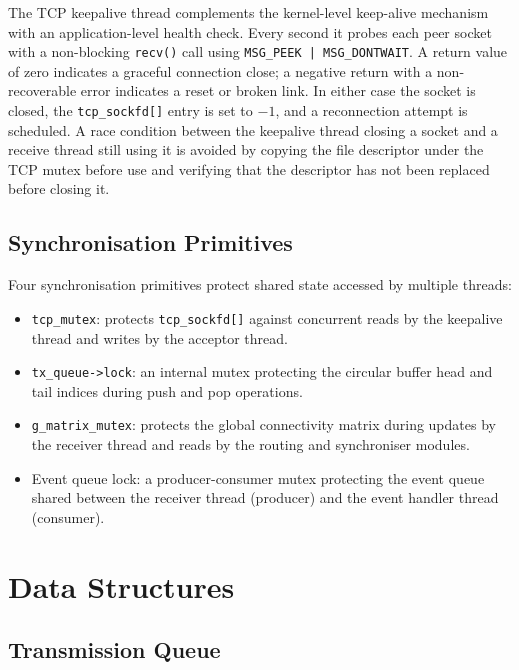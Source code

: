 The TCP keepalive thread complements the kernel-level keep-alive mechanism with an
application-level health check. Every second it probes each peer socket with a non-blocking
\texttt{recv()} call using \texttt{MSG\_PEEK | MSG\_DONTWAIT}. A return value of zero
indicates a graceful connection close; a negative return with a non-recoverable error indicates
a reset or broken link. In either case the socket is closed, the \texttt{tcp\_sockfd[]} entry is
set to $-1$, and a reconnection attempt is scheduled. A race condition between the keepalive
thread closing a socket and a receive thread still using it is avoided by copying the file
descriptor under the TCP mutex before use and verifying that the descriptor has not been
replaced before closing it.

\subsection{Synchronisation Primitives}

Four synchronisation primitives protect shared state accessed by multiple threads:

\begin{itemize}
  \item \texttt{tcp\_mutex}: protects \texttt{tcp\_sockfd[]} against concurrent reads by the
    keepalive thread and writes by the acceptor thread.
  \item \texttt{tx\_queue->lock}: an internal mutex protecting the circular buffer head and
    tail indices during push and pop operations.
  \item \texttt{g\_matrix\_mutex}: protects the global connectivity matrix during updates by
    the receiver thread and reads by the routing and synchroniser modules.
  \item Event queue lock: a producer-consumer mutex protecting the event queue shared
    between the receiver thread (producer) and the event handler thread (consumer).
\end{itemize}


\section{Data Structures}
\label{sec:data-structures}

\subsection{Transmission Queue}

